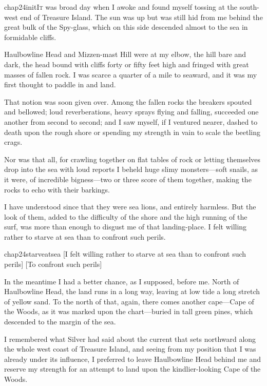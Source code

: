 
\lettrine{chap24initI}{t} was broad day when I awoke and found myself tossing at the south-west end of Treasure Island. The sun was up but was still hid from me behind the great bulk of the Spy-glass, which on this side descended almost to the sea in formidable cliffs.

Haulbowline Head and Mizzen-mast Hill were at my elbow, the hill bare and dark, the head bound with cliffs forty or fifty feet high and fringed with great masses of fallen rock. I was scarce a quarter of a mile to seaward, and it was my first thought to paddle in and land.

That notion was soon given over. Among the fallen rocks the breakers spouted and bellowed; loud reverberations, heavy sprays flying and falling, succeeded one another from second to second; and I saw myself, if I ventured nearer, dashed to death upon the rough shore or spending my strength in vain to scale the beetling crags.

Nor was that all, for crawling together on flat tables of rock or letting themselves drop into the sea with loud reports I beheld huge slimy monsters—soft snails, as it were, of incredible bigness—two or three score of them together, making the rocks to echo with their barkings.

I have understood since that they were sea lions, and entirely harmless. But the look of them, added to the difficulty of the shore and the high running of the surf, was more than enough to disgust me of that landing-place. I felt willing rather to starve at sea than to confront such perils.

\begin{bwbigpic}
	[\basicscale]
	{chap24starveatsea}
	[I felt willing rather to starve at sea than to confront such perils]
	[To confront such perils]
\end{bwbigpic}

In the meantime I had a better chance, as I supposed, before me. North of Haulbowline Head, the land runs in a long way, leaving at low tide a long stretch of yellow sand. To the north of that, again, there comes another cape—Cape of the Woods, as it was marked upon the chart—buried in tall green pines, which descended to the margin of the sea.

I remembered what Silver had said about the current that sets northward along the whole west coast of Treasure Island, and seeing from my position that I was already under its influence, I preferred to leave Haulbowline Head behind me and reserve my strength for an attempt to land upon the kindlier-looking Cape of the Woods.

